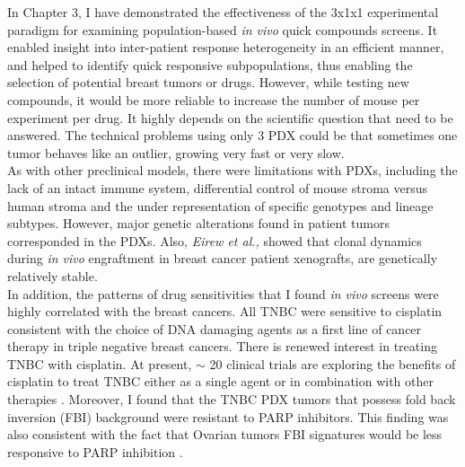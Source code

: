 In Chapter 3, I have demonstrated the effectiveness of the 3x1x1 experimental paradigm for examining population-based \textit{in vivo} quick compounds screens. It enabled insight into inter-patient response heterogeneity in an efficient manner, and helped to identify quick responsive subpopulations, thus enabling the selection of potential breast tumors or drugs. However, while testing new compounds, it would be more reliable to increase the number of mouse per experiment per drug. It highly depends on the scientific question that need to be answered. 
The technical problems using only 3 PDX could be that sometimes one tumor behaves like an outlier, growing very fast or very slow. 
\\
As with other preclinical models, there were limitations with PDXs,
including the lack of an intact immune system, differential control
of mouse stroma versus human stroma and the under representation of specific genotypes and lineage subtypes. However, major genetic alterations found in patient tumors corresponded in the PDXs.  Also, \textit{Eirew et al.,} showed that clonal dynamics during \textit{in vivo} engraftment in breast cancer patient xenografts, are genetically relatively stable.
\\
In addition, the patterns of drug sensitivities that I found \textit{in vivo} screens were highly correlated with the breast cancers. All TNBC were sensitive to cisplatin consistent with the choice of DNA damaging agents as a first line of cancer therapy in triple negative breast cancers. There is renewed interest in treating TNBC with cisplatin. At present, $\sim$ 20 clinical trials are exploring the benefits of cisplatin to treat TNBC either as a single agent or in combination with other therapies \cite{hill2019cisplatin}. Moreover, I found that the TNBC PDX tumors that possess fold back inversion (FBI) background were resistant to PARP inhibitors. This finding was also consistent with the fact that Ovarian tumors  FBI signatures would be less responsive to PARP inhibition \cite{wang2017genomic}.
   
